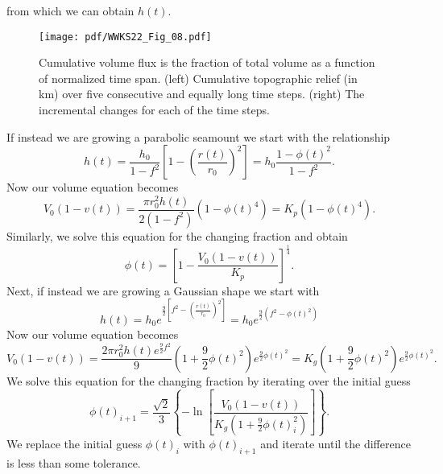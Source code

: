 from which we can obtain $h(t)$.
\begin{figure}
\centering
\texttt{[image: pdf/WWKS22\_Fig\_08.pdf]}
\caption{Cumulative volume flux is the fraction of total volume as a function of normalized time span.
(left) Cumulative topographic relief (in km) over five consecutive and equally long time steps. (right) The incremental
changes for each of the time steps.}
\label{WWKS22_Fig_08}
\end{figure}
If instead we are growing a parabolic seamount we start with the relationship
\begin{equation*}
h(t) = \frac{h_0}{1-f^2} \left [1 - \left (\frac{r(t)}{r_0} \right )^2 \right ] = h_0 \frac{1 - \phi(t)^2}{1 - f^2}.
\end{equation*}
Now our volume equation becomes
\begin{equation*}
V_0 (1 - v(t)) = \frac{\pi r_0^2 h(t)}{2 (1-f^2)} (1 - \phi(t)^4) = K_p (1 - \phi(t)^4).
\end{equation*}
Similarly, we solve this equation for the changing fraction and obtain
\begin{equation*}
\phi(t) = \left [1 - \frac{V_0 (1 - v(t))}{K_p} \right ]^{\frac{1}{4}}.
\end{equation*}
Next, if instead we are growing a Gaussian shape we start with
\begin{equation*}
h(t) = h_0 e^{\frac{9}{2} \left [ f^2 - \left (\frac{r(t)}{r_0} \right )^2 \right ]} = h_0 e^{\frac{9}{2}\left(f^2 - \phi(t)^2\right)}
\end{equation*}
Now our volume equation becomes
\begin{equation*}
V_0 (1 - v(t)) = \frac{2\pi r_0^2 h(t)e^{\frac{9}{2}f^2}}{9} \left (1 + \frac{9}{2}\phi(t)^2\right ) e^{\frac{9}{2}\phi(t)^2} = K_g (1 + \frac{9}{2}\phi(t)^2) e^{\frac{9}{2}\phi(t)^2}.
\end{equation*}
We solve this equation for the changing fraction by iterating over the initial guess
\begin{equation*}
\phi(t)_{i+1} = \frac{\sqrt{2}}{3} \left \{ - \ln \left [\frac{V_0 (1 - v(t))}{K_g \left (1 + \frac{9}{2}\phi(t)^2_i \right )} \right ] \right \}.
\end{equation*}
We replace the initial guess $\phi(t)_i$ with $\phi(t)_{i+1}$ and iterate until the difference
is less than some tolerance.

